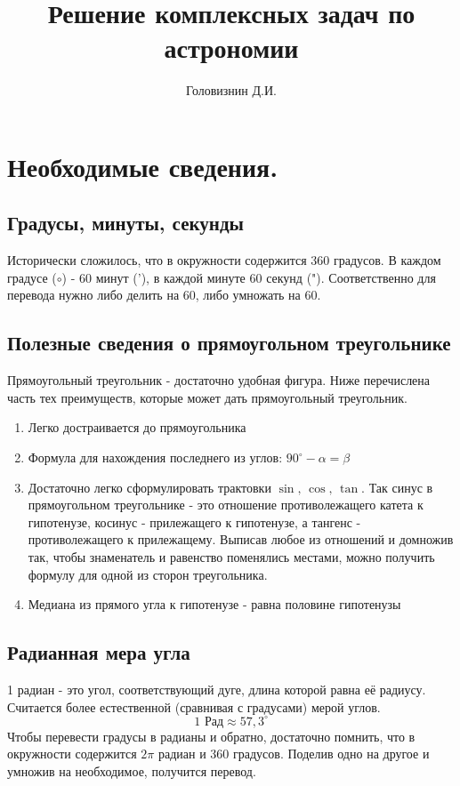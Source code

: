 \documentclass[16pt,a4paper]{report}
\begin{document}
\pagestyle{fancy}
\title{Решение комплексных задач по астрономии}
\author{Головизнин Д.И.}
\fancyhf{}
\fancyfoot[L]{\thepage}
\maketitle
\tableofcontents
\newpage
\chapter{Необходимые сведения.}
\section{Градусы, минуты, секунды}
Исторически сложилось, что в окружности содержится 360 градусов. В каждом градусе (${\circ}$) - 60 минут ('), в каждой минуте 60 секунд ("). Соответственно для перевода нужно либо делить на 60, либо умножать на 60. 

\section{Полезные сведения о прямоугольном треугольнике}
Прямоугольный треугольник - достаточно удобная фигура. Ниже перечислена часть тех преимуществ, которые может дать прямоугольный треугольник.
\begin{enumerate}
    \item Легко достраивается до прямоугольника
    \item Формула для нахождения последнего из углов: $90^{\circ} - \alpha = \beta$
    \item Достаточно легко сформулировать трактовки $\sin \textrm{, }\cos\textrm{, } \tan$. Так синус в прямоугольном треугольнике - это отношение противолежащего катета к гипотенузе, косинус - прилежащего к гипотенузе, а тангенс - противолежащего к прилежащему. Выписав любое из отношений и домножив так, чтобы знаменатель и равенство поменялись местами, можно получить формулу для одной из сторон треугольника.
    \item Медиана из прямого угла к гипотенузе - равна половине гипотенузы
\end{enumerate}
\section{Радианная мера угла}
1 радиан - это угол, соответствующий дуге, длина которой равна её радиусу. Считается более естественной (сравнивая с градусами) мерой углов.$$1 \textrm{ Рад} \approx 57,3^{\circ} $$
Чтобы перевести градусы в радианы и обратно, достаточно помнить, что в окружности содержится $2\pi$ радиан и 360 градусов. Поделив одно на другое и умножив на необходимое, получится перевод.
\end{document}
